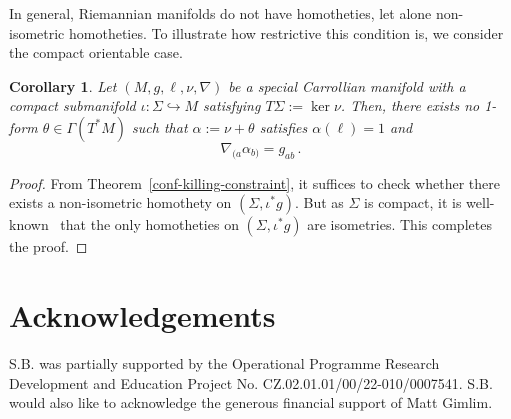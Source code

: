 \documentclass{article}
\newtheorem{corollary}[theorem]{Corollary}
\theoremstyle{definition}
\theoremstyle{remark}
\begin{document}
In general, Riemannian manifolds do not have homotheties, let alone non-isometric homotheties. To illustrate how restrictive this condition is, we consider the compact orientable case.
\begin{corollary}
    Let $(M,g,\ell,\nu,\nabla)$ be a special Carrollian manifold with a compact submanifold $\iota : \Sigma \hookrightarrow M$ satisfying $T\Sigma := \ker \nu$. Then, there exists no 1-form $\theta \in \Gamma(T^* M)$ such that $\alpha := \nu + \theta$ satisfies $\alpha(\ell) = 1$ and
    $$\nabla_{(a} \alpha_{b)} = g_{ab}\,.$$
\end{corollary}
\begin{proof}
    From Theorem~\ref{conf-killing-constraint}, it suffices to check whether there exists a non-isometric homothety on $(\Sigma,\iota^* g)$. But as $\Sigma$ is compact, it is well-known~\cite{Obata1970} that the only homotheties on $(\Sigma,\iota^* g)$ are isometries. This completes the proof.
\end{proof}

\section*{Acknowledgements}
S.B. was partially supported by the Operational Programme Research Development and Education Project No. CZ.02.01.01/00/22-010/0007541. S.B. would also like to acknowledge the generous financial support of Matt Gimlim.




\end{document}
